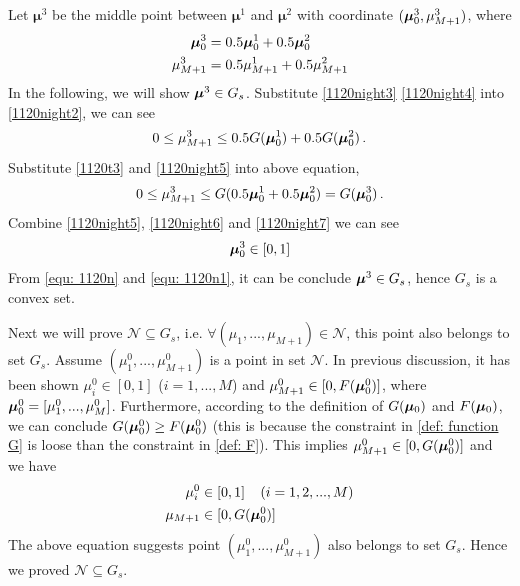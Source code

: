Let $\boldsymbol{\mu}^3$ be the middle point between $\boldsymbol{\mu}^1$ and $\boldsymbol{\mu}^2$ with coordinate $(\boldsymbol{\mu}_0^3, \mu_{M+1}^3)$, where  
\begin{subequations}
\label{1120t5}
\begin{align}
\label{1120night5}
\boldsymbol{\mu}_0^3 &= 0.5\boldsymbol{\mu}_0^1 + 0.5 \boldsymbol{\mu}_0^2\\
\label{1120night2}
\mu_{M+1}^3 &= 0.5 \mu_{M+1}^1 + 0.5 \mu_{M+1}^2
\end{align}
\end{subequations}
In the following, we will show $\boldsymbol{\mu}^3 \in G_s$.  
Substitute \eqref{1120night3} \eqref{1120night4} into \eqref{1120night2}, we can see
\begin{equation}
0 \leq \mu_{M+1}^3 \leq 0.5 G( \boldsymbol{\mu}_0^1) + 0.5G(\boldsymbol{\mu}_0^2)\,.
\end{equation}
Substitute \eqref{1120t3} and \eqref{1120night5} into above equation,
\begin{equation}
\label{equ: 1120n}
0 \leq \mu_{M+1}^3 \leq G(0.5 \boldsymbol{\mu}_0^1 + 0.5\boldsymbol{\mu}_0^2) = G(\boldsymbol{\mu}_0^3)\,.
\end{equation}
Combine  \eqref{1120night5}, \eqref{1120night6} and \eqref{1120night7} we can see
\begin{equation}
\label{equ: 1120n1}
\boldsymbol{\mu}_0^3 \in [0, 1]
\end{equation}
From \eqref{equ: 1120n} and \eqref{equ: 1120n1}, it can be conclude 
 $\boldsymbol{\mu}^3 \in G_s$, hence $G_s$  is a convex set.  

Next we will prove $\mathcal{N} \subseteq G_s$, i.e. $\forall (\mu_1, ..., \mu_{M+1}) \in \mathcal{N}$, this point also belongs to set $G_s$.
Assume $(\mu_1^0, ..., \mu_{M+1}^0)$ is a point in set $\mathcal{N}$. 
In previous discussion, it has been shown $\mu_i^0 \in [0, 1]$ ($i = 1, ..., M$) and $\mu_{M+1}^0 \in [0, F(\boldsymbol{\mu}_0^0)]$, where $\boldsymbol{\mu}_0^0 = [\mu_1^0, ..., \mu_M^0]$. 
Furthermore, according to the definition of $G(\boldsymbol{\mu}_0)$ and $F(\boldsymbol{\mu}_0)$, we can conclude $G(\boldsymbol{\mu}_0^0) \geq F(\boldsymbol{\mu}_0^0)$ (this is because the constraint in \eqref{def: function G} is loose than the constraint in \eqref{def: F}). 
This implies $\mu_{M+1}^0 \in [0, G(\boldsymbol{\mu}_0^0)]$ and we have  
\begin{equation}
\begin{split}
\mu_i^0 &\in [0, 1]\;\;\;\;(i=1, 2, ..., M)\\
\mu_{M+1} &\in [0, G(\boldsymbol{\mu}_0^0)]
\end{split}
\end{equation}
The above equation suggests point $(\mu_1^0, ..., \mu_{M+1}^0)$ also belongs to set $G_s$.
Hence we proved $\mathcal{N} \subseteq G_s$. 

